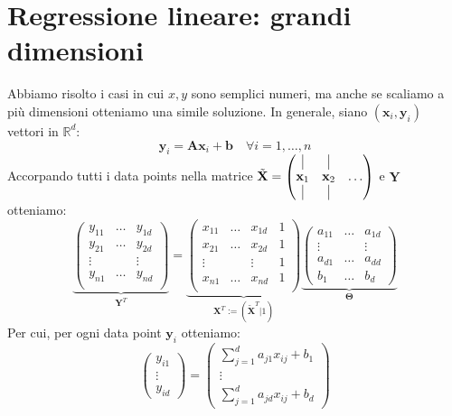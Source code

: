 \documentclass{article}
\begin{document}
    \section{Regressione lineare: grandi dimensioni}
        Abbiamo risolto i casi in cui $x,y$ sono semplici numeri, ma anche se scaliamo a più dimensioni otteniamo una simile soluzione.
        In generale, siano $(\mathbf{x}_i, \mathbf{y}_i)$ vettori in $\mathbb{R}^d$:
            \[\mathbf{y}_i = \mathbf{Ax}_i + \mathbf{b} \quad \forall i=1,\dots,n\]
        Accorpando tutti i data points nella matrice $\tilde{\mathbf{X}} = \begin{pmatrix}
            \vline       & \vline       & \\
            \mathbf{x}_1 & \mathbf{x}_2 & \dots \\
            \vline       & \vline       & 
        \end{pmatrix}$ e $\mathbf{Y}$ otteniamo:
        \[\underbrace{\begin{pmatrix}
            y_{11} & \dots & y_{1d} \\
            y_{21} & \dots & y_{2d} \\
            \vdots &       & \vdots \\
            y_{n1} & \dots & y_{nd} \\
        \end{pmatrix}}_{\mathbf{Y}^T} = \underbrace{\begin{pmatrix}
            x_{11} & \dots & x_{1d} & 1\\
            x_{21} & \dots & x_{2d} & 1\\
            \vdots &       & \vdots & 1\\
            x_{n1} & \dots & x_{nd} & 1\\
        \end{pmatrix}}_{\mathbf{X}^T := (\tilde{\mathbf{X}}^T | 1)}
        \underbrace{\begin{pmatrix}
            a_{11} &  \dots & a_{1d} \\
            \vdots &        & \vdots \\
            a_{d1} &  \dots & a_{dd} \\
            b_1    &  \dots & b_d 
        \end{pmatrix}}_\mathbf{\Theta}
        \]
        Per cui, per ogni data point $\mathbf{y}_i$ otteniamo:
        \[
            \begin{pmatrix}
                y_{i1} \\
                \vdots \\
                y_{id}
            \end{pmatrix} =
            \begin{pmatrix}
                \sum_{j=1}^d a_{j1}x_{ij} + b_1 \\
                \vdots \\
                \sum_{j=1}^d a_{jd}x_{ij} + b_d
            \end{pmatrix}
        \]
\end{document}
